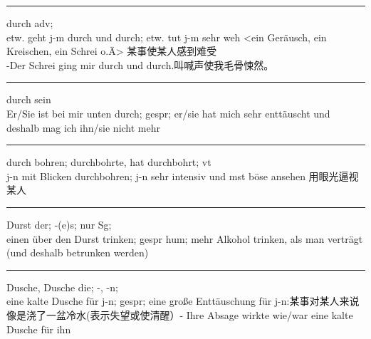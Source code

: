 \noindent\rule{\textwidth}{1pt}
durch adv;\\
etw. geht j-m durch und durch; etw. tut j-m sehr weh <ein Ger\"ausch, ein Kreischen, ein Schrei o.\"A> 某事使某人感到难受\\
-Der Schrei ging mir durch und durch.叫喊声使我毛骨悚然。

\noindent\rule{\textwidth}{1pt}
durch sein \\
Er/Sie ist bei mir unten durch; gespr; er/sie hat mich sehr entt\"auscht und deshalb mag ich ihn/sie nicht mehr \\

\noindent\rule{\textwidth}{1pt}
durch bohren; durchbohrte, hat durchbohrt; vt\\
j-n mit Blicken durchbohren; j-n sehr intensiv und mst b\"ose ansehen 用眼光逼视某人\\

\noindent\rule{\textwidth}{1pt}
Durst der; -(e)s; nur Sg; \\
einen \"uber den Durst trinken; gespr hum; mehr Alkohol trinken, als man vertr\"agt (und deshalb betrunken werden)

\noindent\rule{\textwidth}{1pt}
Dusche, Dusche die; -, -n; \\
eine kalte Dusche f\"ur j-n; gespr; eine gro\ss{}e Entt\"auschung f\"ur j-n:某事对某人来说像是浇了一盆冷水(表示失望或使清醒）- Ihre Absage wirkte wie/war eine kalte Dusche f\"ur ihn \\





